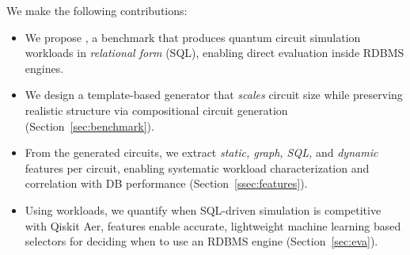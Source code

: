 We make the following contributions:
\begin{itemize}[leftmargin=*]
    \item 
    We propose \sys, a benchmark %
    that produces quantum circuit simulation workloads in \emph{relational form} (SQL),
    enabling direct evaluation inside RDBMS engines.

    \item 
    We design a template-based generator
    that \emph{scales} circuit size while preserving realistic structure via compositional circuit generation (Section~\ref{sec:benchmark}). 

     \item %
    From the generated circuits, we extract \emph{static, graph, SQL,} and \emph{dynamic} features per circuit, enabling
    systematic workload characterization and correlation with DB performance 
    (Section~\ref{ssec:features}).

  
    
    \item Using \sys workloads, we quantify when SQL-driven simulation is competitive with Qiskit Aer, 
    \sys features enable accurate, lightweight machine learning based selectors for deciding when to use an
    RDBMS engine (Section~\ref{sec:eva}).
\end{itemize}


